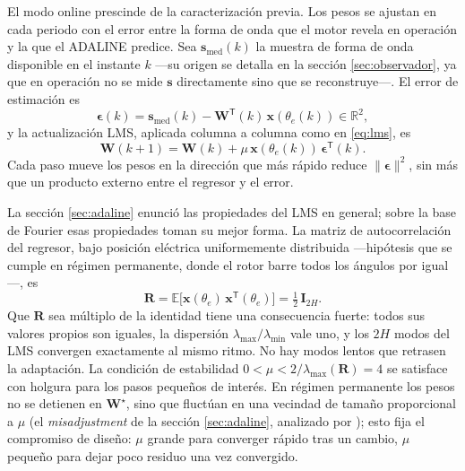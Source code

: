 \documentclass[../../../Tesis_JALS_Maestria.tex]{subfiles}
\begin{document}
El modo online prescinde de la caracterización previa. Los pesos se ajustan en cada periodo con el error entre la forma de onda que el motor revela en operación y la que el ADALINE predice. Sea $\mathbf{s}_\mathrm{med}(k)$ la muestra de forma de onda disponible en el instante $k$ ---su origen se detalla en la sección \ref{sec:observador}, ya que en operación no se mide $\mathbf{s}$ directamente sino que se reconstruye---. El error de estimación es
\begin{equation}
    \boldsymbol{\epsilon}(k) = \mathbf{s}_\mathrm{med}(k) - \mathbf{W}^{\mathsf T}(k)\,\mathbf{x}(\theta_e(k)) \in \mathbb{R}^2,
    \label{eq:error-online}
\end{equation}
y la actualización LMS, aplicada columna a columna como en \eqref{eq:lms}, es
\begin{equation}
    \mathbf{W}(k+1) = \mathbf{W}(k) + \mu\,\mathbf{x}(\theta_e(k))\,\boldsymbol{\epsilon}^{\mathsf T}(k).
    \label{eq:lms-online}
\end{equation}
Cada paso mueve los pesos en la dirección que más rápido reduce $\|\boldsymbol{\epsilon}\|^2$, sin más que un producto externo entre el regresor y el error.

La sección \ref{sec:adaline} enunció las propiedades del LMS en general; sobre la base de Fourier esas propiedades toman su mejor forma. La matriz de autocorrelación del regresor, bajo posición eléctrica uniformemente distribuida ---hipótesis que se cumple en régimen permanente, donde el rotor barre todos los ángulos por igual---, es
\begin{equation}
    \mathbf{R} = \mathbb{E}\bigl[\mathbf{x}(\theta_e)\,\mathbf{x}^{\mathsf T}(\theta_e)\bigr] = \tfrac{1}{2}\,\mathbf{I}_{2H}.
    \label{eq:autocorrelacion}
\end{equation}
Que $\mathbf{R}$ sea múltiplo de la identidad tiene una consecuencia fuerte: todos sus valores propios son iguales, la dispersión $\lambda_{\max}/\lambda_{\min}$ vale uno, y los $2H$ modos del LMS convergen exactamente al mismo ritmo. No hay modos lentos que retrasen la adaptación. La condición de estabilidad $0 < \mu < 2/\lambda_{\max}(\mathbf{R}) = 4$ se satisface con holgura para los pasos pequeños de interés. En régimen permanente los pesos no se detienen en $\mathbf{W}^\star$, sino que fluctúan en una vecindad de tamaño proporcional a $\mu$ (el \emph{misadjustment} de la sección \ref{sec:adaline}, analizado por \citealp{widrow1976lms}); esto fija el compromiso de diseño: $\mu$ grande para converger rápido tras un cambio, $\mu$ pequeño para dejar poco residuo una vez convergido.
\end{document}
